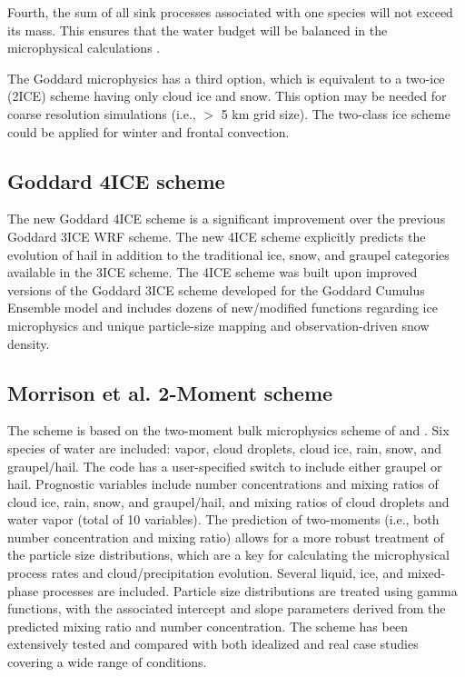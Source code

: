 Fourth, the sum of all sink processes associated with one species will not exceed its mass.  This ensures that the water budget will be balanced in the microphysical calculations .

The Goddard microphysics has a third option, which is equivalent to a two-ice (2ICE) scheme having only cloud ice and snow.  This option may be needed for coarse resolution simulations (i.e., $>$ 5 km grid size).  The two-class ice scheme could be applied for winter and frontal convection.

\subsection {Goddard 4ICE  scheme}

The new Goddard 4ICE scheme \citep{lang14, tao16} is a significant improvement over the previous Goddard 3ICE WRF scheme.  The new 4ICE scheme explicitly predicts the evolution of hail in addition to the traditional ice, snow, and graupel categories available in the 3ICE scheme.  The 4ICE scheme was built upon improved versions of the Goddard 3ICE scheme developed for the Goddard Cumulus Ensemble model and includes dozens of new/modified functions regarding ice microphysics and unique particle-size mapping and observation-driven snow density.

\subsection {Morrison et al. 2-Moment scheme}

The \citet{morrison08} scheme is based on the two-moment bulk
microphysics scheme of \citet{morrison05} and \citet{morrison06}. Six species of
water are included: vapor, cloud droplets, cloud ice, rain, snow, and
graupel/hail. The code has a user-specified switch to include either graupel or hail. 
Prognostic variables include number concentrations and mixing ratios
of cloud ice, rain, snow, and graupel/hail, and mixing ratios of cloud
droplets and water vapor (total of 10 variables). The prediction of two-moments (i.e., both number concentration and
mixing ratio) allows for a more robust treatment of the particle size
distributions, which are a key for calculating the microphysical process rates
and cloud/precipitation evolution. Several liquid, ice, and mixed-phase
processes are included. Particle size distributions are treated using gamma
functions, with the associated intercept and slope parameters derived from the
predicted mixing ratio and number concentration.
The scheme has been extensively tested and compared with both
idealized and real case studies covering a wide range of conditions.

